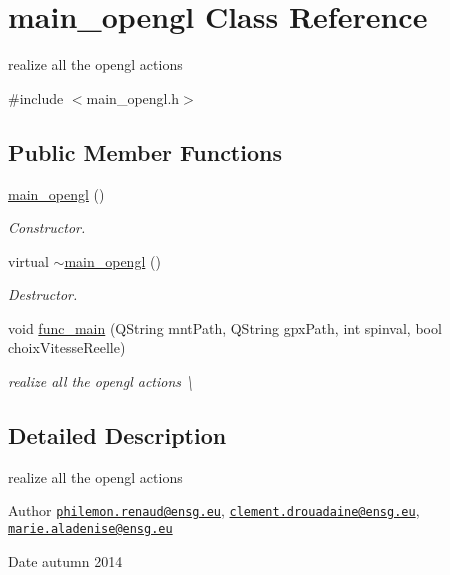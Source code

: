 \hypertarget{classmain__opengl}{\section{main\+\_\+opengl Class Reference}
\label{classmain__opengl}
}


realize all the opengl actions  




{\ttfamily \#include $<$main\+\_\+opengl.\+h$>$}

\subsection*{Public Member Functions}
\begin{DoxyCompactItemize}
\item 
\hyperlink{classmain__opengl_ab2131657f95146deedb43cad71717dd8}{main\+\_\+opengl} ()
\begin{DoxyCompactList}\small\item\em Constructor. \end{DoxyCompactList}\item 
virtual \hyperlink{classmain__opengl_a7a4c913ed1952f46de5ae2b054c60ced}{$\sim$main\+\_\+opengl} ()
\begin{DoxyCompactList}\small\item\em Destructor. \end{DoxyCompactList}\item 
void \hyperlink{classmain__opengl_a4c9621ea1973054d665b7a6b721de666}{func\+\_\+main} (Q\+String mnt\+Path, Q\+String gpx\+Path, int spinval, bool choix\+Vitesse\+Reelle)
\begin{DoxyCompactList}\small\item\em realize all the opengl actions \textbackslash{} \end{DoxyCompactList}\end{DoxyCompactItemize}


\subsection{Detailed Description}
realize all the opengl actions 

\begin{DoxyAuthor}{Author}
\href{mailto:philemon.renaud@ensg.eu}{\tt philemon.\+renaud@ensg.\+eu}, \href{mailto:clement.drouadaine@ensg.eu}{\tt clement.\+drouadaine@ensg.\+eu}, \href{mailto:marie.aladenise@ensg.eu}{\tt marie.\+aladenise@ensg.\+eu} 
\end{DoxyAuthor}
\begin{DoxyDate}{Date}
autumn 2014 
\end{DoxyDate}



